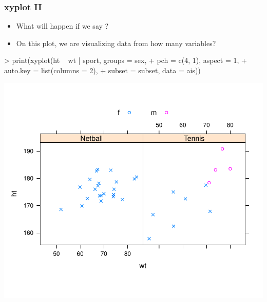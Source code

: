 \begin{frame}
  \frametitle{xyplot II}
  \begin{itemize}
  \item What will happen if we say ?
  \item On this plot, we are visualizing data from how many variables?
  \end{itemize}
\begin{Schunk}
\begin{Sinput}
> print(xyplot(ht ~ wt | sport, groups = sex, 
+     pch = c(4, 1), aspect = 1, 
+     auto.key = list(columns = 2), 
+     subset = subset, data = ais))
\end{Sinput}
\end{Schunk}
\includegraphics{plots/fig-021}
\end{frame}

